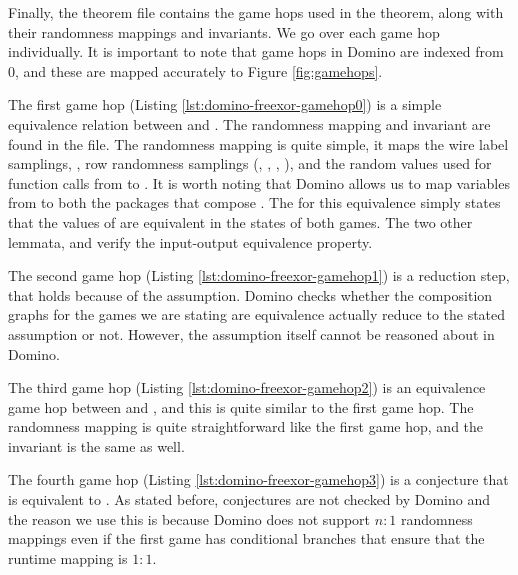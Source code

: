 

Finally, the theorem file contains the game hops used in the theorem, along with their randomness mappings and invariants. We go over each game hop individually. It is important to note that game hops in Domino are indexed from 0, and these are mapped accurately to Figure \ref{fig:gamehops}.


The first game hop (Listing \ref{lst:domino-freexor-gamehop0}) is a simple equivalence relation between   and . The randomness mapping and invariant are found in the  file. The randomness mapping is quite simple, it maps the wire label samplings, , row randomness samplings (, , , ), and the random values used for  function calls from  to . It is worth noting that Domino allows us to map variables from  to both the packages that compose . The  for this equivalence simply states that the values of  are equivalent in the states of both games. The two other lemmata,  and  verify the input-output equivalence property. 


The second game hop (Listing \ref{lst:domino-freexor-gamehop1}) is a reduction step, that holds because of the  assumption. Domino checks whether the composition graphs for the games we are stating are equivalence actually reduce to the stated assumption or not. However, the assumption itself cannot be reasoned about in Domino.


The third game hop (Listing \ref{lst:domino-freexor-gamehop2}) is an equivalence game hop between   and , and this is quite similar to the first game hop. The randomness mapping is quite straightforward like the first game hop, and the invariant is the same as well.


The fourth game hop (Listing \ref{lst:domino-freexor-gamehop3}) is a conjecture that  is equivalent to . As stated before, conjectures are not checked by Domino and the reason we use this is because Domino does not support $n:1$ randomness mappings even if the first game has conditional branches that ensure that the runtime mapping is $1:1$.  

